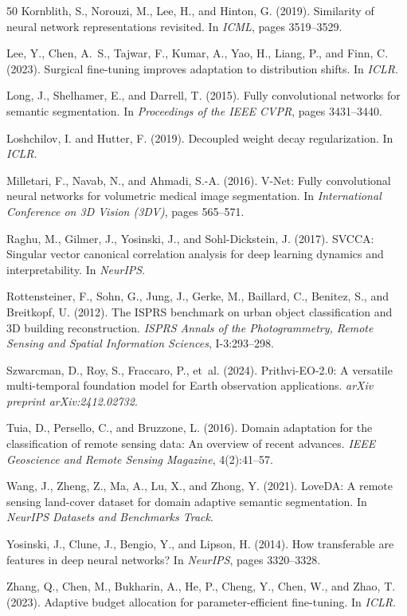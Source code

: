 \documentclass[11pt,a4paper]{report}
\begin{document}
\begin{thebibliography}{50}
Kornblith, S., Norouzi, M., Lee, H., and Hinton, G. (2019).
Similarity of neural network representations revisited.
In \emph{ICML}, pages 3519--3529.

Lee, Y., Chen, A.~S., Tajwar, F., Kumar, A., Yao, H., Liang, P., and Finn, C. (2023).
Surgical fine-tuning improves adaptation to distribution shifts.
In \emph{ICLR}.

Long, J., Shelhamer, E., and Darrell, T. (2015).
Fully convolutional networks for semantic segmentation.
In \emph{Proceedings of the IEEE CVPR}, pages 3431--3440.

Loshchilov, I. and Hutter, F. (2019).
Decoupled weight decay regularization.
In \emph{ICLR}.

Milletari, F., Navab, N., and Ahmadi, S.-A. (2016).
V-Net: Fully convolutional neural networks for volumetric medical image segmentation.
In \emph{International Conference on 3D Vision (3DV)}, pages 565--571.

Raghu, M., Gilmer, J., Yosinski, J., and Sohl-Dickstein, J. (2017).
SVCCA: Singular vector canonical correlation analysis for deep learning dynamics and interpretability.
In \emph{NeurIPS}.

Rottensteiner, F., Sohn, G., Jung, J., Gerke, M., Baillard, C., Benitez, S., and Breitkopf, U. (2012).
The ISPRS benchmark on urban object classification and 3D building reconstruction.
\emph{ISPRS Annals of the Photogrammetry, Remote Sensing and Spatial Information Sciences}, I-3:293--298.

Szwarcman, D., Roy, S., Fraccaro, P., et~al. (2024).
Prithvi-EO-2.0: A versatile multi-temporal foundation model for Earth observation applications.
\emph{arXiv preprint arXiv:2412.02732}.

Tuia, D., Persello, C., and Bruzzone, L. (2016).
Domain adaptation for the classification of remote sensing data: An overview of recent advances.
\emph{IEEE Geoscience and Remote Sensing Magazine}, 4(2):41--57.

Wang, J., Zheng, Z., Ma, A., Lu, X., and Zhong, Y. (2021).
LoveDA: A remote sensing land-cover dataset for domain adaptive semantic segmentation.
In \emph{NeurIPS Datasets and Benchmarks Track}.

Yosinski, J., Clune, J., Bengio, Y., and Lipson, H. (2014).
How transferable are features in deep neural networks?
In \emph{NeurIPS}, pages 3320--3328.

Zhang, Q., Chen, M., Bukharin, A., He, P., Cheng, Y., Chen, W., and Zhao, T. (2023).
Adaptive budget allocation for parameter-efficient fine-tuning.
In \emph{ICLR}.

\end{thebibliography}
\end{document}
